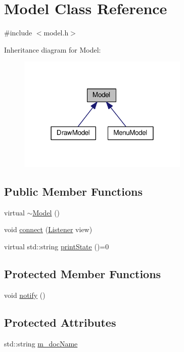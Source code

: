 \hypertarget{classModel}{\section{Model Class Reference}
\label{classModel}
}


{\ttfamily \#include $<$model.\-h$>$}



Inheritance diagram for Model\-:
\nopagebreak
\begin{figure}[H]
\begin{center}
\leavevmode
\includegraphics[width=231pt]{classModel__inherit__graph}
\end{center}
\end{figure}
\subsection*{Public Member Functions}
\begin{DoxyCompactItemize}
\item 
virtual \hyperlink{classModel_ad6ebd2062a0b823db841a0b88baac4c0}{$\sim$\-Model} ()
\item 
void \hyperlink{classModel_af12598805e6271d9c64f90d31c15f7d3}{connect} (\hyperlink{model_8h_aac0c1ba55260a4d57385cf6a95c5df0a}{Listener} view)
\item 
virtual std\-::string \hyperlink{classModel_a853995c3960bc17b4df783d76ca5dfeb}{print\-State} ()=0
\end{DoxyCompactItemize}
\subsection*{Protected Member Functions}
\begin{DoxyCompactItemize}
\item 
void \hyperlink{classModel_a9f6a71b1dbc4fb979781f355ae9c78d2}{notify} ()
\end{DoxyCompactItemize}
\subsection*{Protected Attributes}
\begin{DoxyCompactItemize}
\item 
std\-::string \hyperlink{classModel_a4f8aa4311a54d069a54dc2626461163f}{m\-\_\-doc\-Name}
\end{DoxyCompactItemize}


